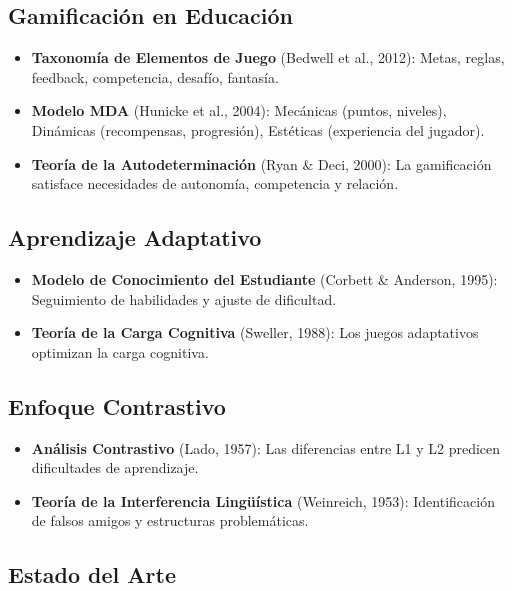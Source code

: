 \documentclass[12pt,a4paper]{article}
\begin{document}
\subsection{Gamificación en Educación}

\begin{itemize}
    \item \textbf{Taxonomía de Elementos de Juego} (Bedwell et al., 2012): Metas, reglas, feedback, competencia, desafío, fantasía.
    
    \item \textbf{Modelo MDA} (Hunicke et al., 2004): Mecánicas (puntos, niveles), Dinámicas (recompensas, progresión), Estéticas (experiencia del jugador).
    
    \item \textbf{Teoría de la Autodeterminación} (Ryan \& Deci, 2000): La gamificación satisface necesidades de autonomía, competencia y relación.
\end{itemize}

\subsection{Aprendizaje Adaptativo}

\begin{itemize}
    \item \textbf{Modelo de Conocimiento del Estudiante} (Corbett \& Anderson, 1995): Seguimiento de habilidades y ajuste de dificultad.
    
    \item \textbf{Teoría de la Carga Cognitiva} (Sweller, 1988): Los juegos adaptativos optimizan la carga cognitiva.
\end{itemize}

\subsection{Enfoque Contrastivo}

\begin{itemize}
    \item \textbf{Análisis Contrastivo} (Lado, 1957): Las diferencias entre L1 y L2 predicen dificultades de aprendizaje.
    \item \textbf{Teoría de la Interferencia Lingüística} (Weinreich, 1953): Identificación de falsos amigos y estructuras problemáticas.
\end{itemize}

\subsection{Estado del Arte}
\end{document}
